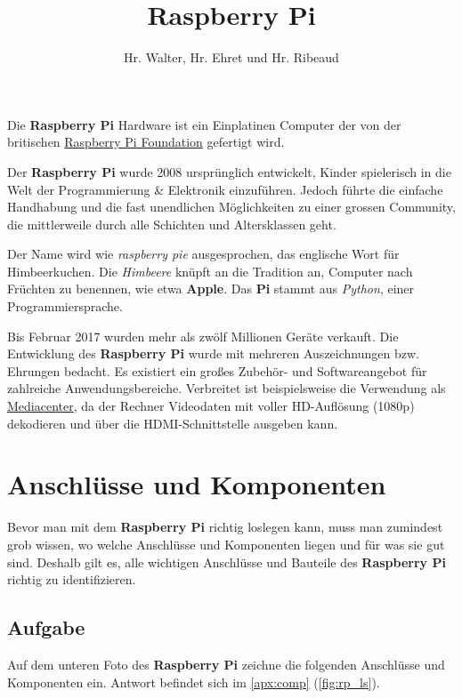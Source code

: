 \documentclass[12pt,a4paper]{article}
\newcommand{\rp}{\textbf{Raspberry Pi}\xspace}
\begin{document}
\title{Raspberry Pi}
\author{Hr. Walter, Hr. Ehret und Hr. Ribeaud}
\maketitle

Die \rp Hardware ist ein Einplatinen Computer der von der britischen \href{https://www.raspberrypi.org/}{Raspberry Pi Foundation} gefertigt wird.

Der \rp wurde 2008 ursprünglich entwickelt, Kinder spielerisch in die Welt der Programmierung \& Elektronik einzuführen. Jedoch führte die einfache Handhabung und die fast unendlichen Möglichkeiten zu einer grossen Community, die mittlerweile durch alle Schichten und Altersklassen geht.

Der Name wird wie \textit{raspberry pie} ausgesprochen, das englische Wort für Himbeerkuchen. Die \textit{Himbeere} knüpft an die Tradition an, Computer nach Früchten zu benennen, wie etwa \textbf{Apple}. Das \textbf{Pi} stammt aus \textit{Python}, einer Programmiersprache.

Bis Februar 2017 wurden mehr als zwölf Millionen Geräte verkauft. Die Entwicklung des \textbf{Raspberry Pi} wurde mit mehreren Auszeichnungen bzw. Ehrungen bedacht. Es existiert ein großes Zubehör- und Softwareangebot für zahlreiche Anwendungsbereiche. Verbreitet ist beispielsweise die Verwendung als \href{https://www.youtube.com/watch?v=YPu7oSVbMVo}{Mediacenter}, da der Rechner Videodaten mit voller HD-Auflösung (1080p) dekodieren und über die HDMI-Schnittstelle ausgeben kann. 

\section{Anschlüsse und Komponenten}
\label{sec:comp}

Bevor man mit dem \rp richtig loslegen kann, muss man zumindest grob wissen, wo welche Anschlüsse und Komponenten liegen und für was sie gut sind. Deshalb gilt es, alle wichtigen Anschlüsse und Bauteile des \rp richtig zu identifizieren.

\subsection{Aufgabe}

Auf dem unteren Foto des \rp zeichne die folgenden Anschlüsse und Komponenten ein. Antwort befindet sich im \cref{apx:comp} (\cref{fig:rp_ls}).
\end{document}
